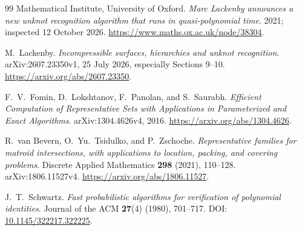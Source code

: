 \documentclass[11pt,letterpaper]{article}
\theoremstyle{definition}
\begin{document}
\begin{thebibliography}{99}
Mathematical Institute, University of Oxford.
\emph{Marc Lackenby announces a new unknot recognition algorithm that runs
in quasi-polynomial time}. 2021; inspected 12 October 2026.
\url{https://www.maths.ox.ac.uk/node/38304}.

M.~Lackenby.
\emph{Incompressible surfaces, hierarchies and unknot recognition}.
arXiv:2607.23350v1, 25 July 2026, especially Sections 9--10.
\url{https://arxiv.org/abs/2607.23350}.

F.~V.~Fomin, D.~Lokshtanov, F.~Panolan, and S.~Saurabh.
\emph{Efficient Computation of Representative Sets with Applications in
Parameterized and Exact Algorithms}.
arXiv:1304.4626v4, 2016.
\url{https://arxiv.org/abs/1304.4626}.

R.~van Bevern, O.~Yu.~Tsidulko, and P.~Zschoche.
\emph{Representative families for matroid intersections, with applications
to location, packing, and covering problems}.
Discrete Applied Mathematics \textbf{298} (2021), 110--128.
arXiv:1806.11527v4.
\url{https://arxiv.org/abs/1806.11527}.

J.~T.~Schwartz.
\emph{Fast probabilistic algorithms for verification of polynomial identities}.
Journal of the ACM \textbf{27}(4) (1980), 701--717.
DOI: \href{https://doi.org/10.1145/322217.322225}{10.1145/322217.322225}.
\end{thebibliography}
\end{document}
